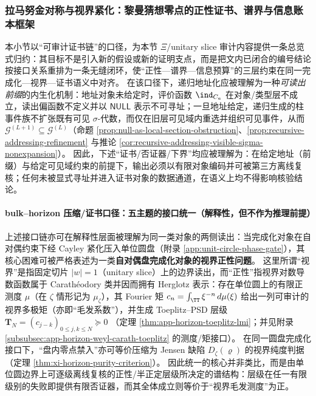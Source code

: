 \subsubsection{拉马努金对称与视界紧化：黎曼猜想零点的正性证书、谱界与信息账本框架}\label{subsubsec:xi-ramanujan-horizon-ledger-framework}
本小节以“可审计证书链”的口径，为本节 \(\Xi\)/unitary slice 审计内容提供一条总览式归约：其目标不是引入新的假设或新的证明支点，而是把文内已闭合的编号结论按接口关系重排为一条无缝闭环，使“正性—谱界—信息预算”的三层约束在同一完成化—视界—证书语义中对齐。
在该口径下，递归地址化应被理解为一种\emph{可读出前缀}的内生化机制：地址对象未给定时，评价函数 \(\ind_{C_a}\) 在对象/类型层不成立，读出偏函数不定义并以 \(\mathsf{NULL}\) 表示不可寻址；一旦地址给定，递归生成的柱事件族不扩张既有可见 \(\sigma\)-代数，而仅在旧层可见域内重选并组织可见事件，从而 \(\mathcal{G}^{(L+1)}\subseteq\mathcal{G}^{(L)}\)（命题 \ref{prop:null-as-local-section-obstruction}、\ref{prop:recursive-addressing-refinement} 与推论 \ref{cor:recursive-addressing-visible-sigma-nonexpansion}）。
因此，下述“证书/否证器/下界”均应被理解为：在给定地址（前缀）与给定可见域约束的前提下，输出必须以有限对象编码并可被第三方离线复核；任何未被显式寻址并进入证书对象的数据通道，在语义上均不得影响核验结论。

\paragraph{bulk--horizon 压缩/证书口径：五主题的接口统一（解释性，但不作为推理前提）}
上述接口链亦可在解释性层面被理解为同一类对象的两侧读出：当完成化对象在自对偶约束下经 Cayley 紧化压入单位圆盘（附录 \ref{app:unit-circle-phase-gate}），其核心困难可被严格表述为一类\textbf{自对偶盘完成化对象的视界正性问题}。
这里所谓“视界”是指固定切片 \(|w|=1\)（unitary slice）上的边界读出，而“正性”指视界对数导数函数属于 Carath\'eodory 类并因而拥有 Herglotz 表示：存在单位圆上的有限正测度 \(\mu\)（在 \(\zeta\) 情形记为 \(\mu_{\zeta}\)），其 Fourier 矩
\(
c_n=\int_{\TT}\xi^{-n}\,d\mu(\xi)
\)
给出一列可审计的视界多极矩（亦即“毛发系数”），并生成 Toeplitz--PSD 层级
\(
\mathbf{T}_N=(c_{j-k})_{0\le j,k\le N}\succeq 0
\)
（定理 \ref{thm:app-horizon-toeplitz-lmi}；并见附录 \ref{subsubsec:app-horizon-weyl-carath-toeplitz} 的测度/矩接口）。
在同一圆盘完成化接口下，“盘内零点禁入”亦可等价压缩为 Jensen 缺陷 \(D_{\zeta}(\varrho)\) 的视界纯度判据（定理 \ref{thm:xi-horizon-purity-criterion}）。
因此统一的核心并非类比，而是由单位圆边界上可逐级离线复核的正性/半正定层级所决定的谱结构：层级在任一有限级别的失败即提供有限否证器，而其全体成立则等价于“视界毛发测度”为正。

